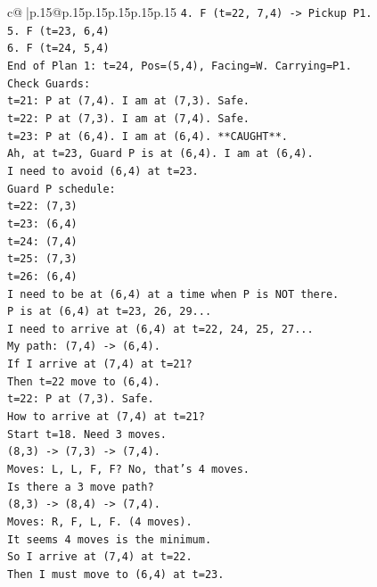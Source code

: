 \documentclass{article}
\begin{document}
{\begin{supertabular}{c@{$\;$}|p{.15\linewidth}@{}p{.15\linewidth}p{.15\linewidth}p{.15\linewidth}p{.15\linewidth}p{.15\linewidth}}
{{{\texttt{4. F (t=22, 7,4) {-}> Pickup P1.} \\
\texttt{5. F (t=23, 6,4)} \\
\texttt{6. F (t=24, 5,4)} \\
\texttt{End of Plan 1: t=24, Pos=(5,4), Facing=W. Carrying=P1.} \\
\texttt{Check Guards:} \\
\texttt{t=21: P at (7,4). I am at (7,3). Safe.} \\
\texttt{t=22: P at (7,3). I am at (7,4). Safe.} \\
\texttt{t=23: P at (6,4). I am at (6,4). **CAUGHT**.} \\
\texttt{Ah, at t=23, Guard P is at (6,4). I am at (6,4).} \\
\texttt{I need to avoid (6,4) at t=23.} \\
\texttt{Guard P schedule:} \\
\texttt{t=22: (7,3)} \\
\texttt{t=23: (6,4)} \\
\texttt{t=24: (7,4)} \\
\texttt{t=25: (7,3)} \\
\texttt{t=26: (6,4)} \\
\texttt{I need to be at (6,4) at a time when P is NOT there.} \\
\texttt{P is at (6,4) at t=23, 26, 29...} \\
\texttt{I need to arrive at (6,4) at t=22, 24, 25, 27...} \\
\texttt{My path: (7,4) {-}> (6,4).} \\
\texttt{If I arrive at (7,4) at t=21?} \\
\texttt{Then t=22 move to (6,4).} \\
\texttt{t=22: P at (7,3). Safe.} \\
\texttt{How to arrive at (7,4) at t=21?} \\
\texttt{Start t=18. Need 3 moves.} \\
\texttt{(8,3) {-}> (7,3) {-}> (7,4).} \\
\texttt{Moves: L, L, F, F? No, that's 4 moves.} \\
\texttt{Is there a 3 move path?} \\
\texttt{(8,3) {-}> (8,4) {-}> (7,4).} \\
\texttt{Moves: R, F, L, F. (4 moves).} \\
\texttt{It seems 4 moves is the minimum.} \\
\texttt{So I arrive at (7,4) at t=22.} \\
\texttt{Then I must move to (6,4) at t=23.} \\
}}}
\end{supertabular}}
\end{document}
